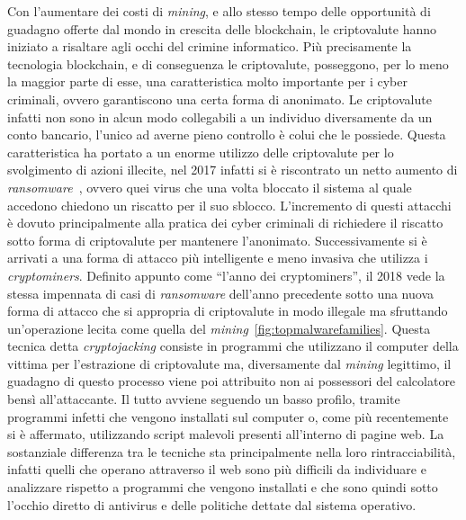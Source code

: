 \documentclass[
11pt, %
oneside, %
italian, %
onehalfspacing,%
headsepline, %
]{MastersDoctoralThesis} %
\begin{document}
Con l'aumentare dei costi di \emph{mining}, e allo stesso tempo delle opportunità di guadagno offerte dal mondo in crescita delle blockchain, le criptovalute hanno iniziato a risaltare agli occhi del crimine informatico. Più precisamente la tecnologia blockchain, e di conseguenza le criptovalute, posseggono, per lo meno la maggior parte di esse, una caratteristica molto importante per i cyber criminali, ovvero garantiscono una certa forma di anonimato. Le criptovalute infatti non sono in alcun modo collegabili a un individuo diversamente da un conto bancario, l'unico ad averne pieno controllo è colui che le possiede. Questa caratteristica ha portato a un enorme utilizzo delle criptovalute per lo svolgimento di azioni illecite, nel 2017 infatti si è riscontrato un netto aumento di \emph{ransomware}~\citep{skyboxtrends}, ovvero quei virus che una volta bloccato il sistema al quale accedono chiedono un riscatto per il suo sblocco. L'incremento di questi attacchi è dovuto principalmente alla pratica dei cyber criminali di richiedere il riscatto sotto forma di criptovalute per mantenere l'anonimato. Successivamente si è arrivati a una forma di attacco più intelligente e meno invasiva che utilizza i \emph{cryptominers}. Definito appunto come ``l'anno dei cryptominers'', il 2018 vede la stessa impennata di casi di \emph{ransomware} dell'anno precedente sotto una nuova forma di attacco che si appropria di criptovalute in modo illegale ma sfruttando un'operazione lecita come quella del \emph{mining}~\ref{fig:topmalwarefamilies}. Questa tecnica detta \emph{cryptojacking} consiste in programmi che utilizzano il computer della vittima per l'estrazione di criptovalute ma, diversamente dal \emph{mining} legittimo, il guadagno di questo processo viene poi attribuito non ai possessori del calcolatore bensì all'attaccante. Il tutto avviene seguendo un basso profilo, tramite programmi infetti che vengono installati sul computer o, come più recentemente si è affermato, utilizzando script malevoli presenti all'interno di pagine web. La sostanziale differenza tra le tecniche sta principalmente nella loro rintracciabilità, infatti quelli che operano attraverso il web sono più difficili da individuare e analizzare rispetto a programmi che vengono installati e che sono quindi sotto l'occhio diretto di antivirus e delle politiche dettate dal sistema operativo.\\
\end{document}
